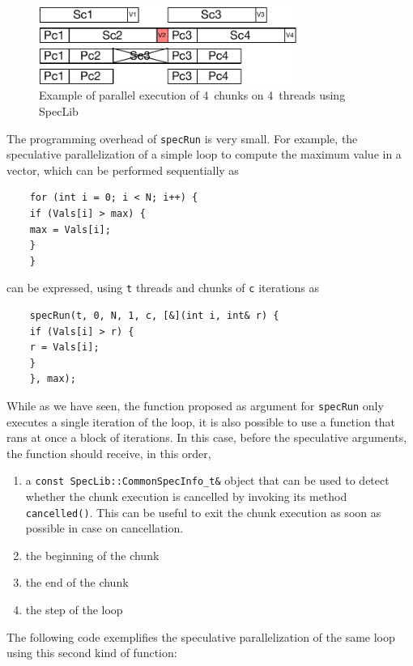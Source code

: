 \documentclass[11pt,a4paper]{article}
\begin{document}
	\begin{figure}[t]
		\begin{center}
			\includegraphics[width=0.75\textwidth]{SpecLib.pdf}
			\caption{Example of parallel execution of 4~chunks on 4~threads using SpecLib}\label{fig:spec_execution}
		\end{center}
	\end{figure}
	
	The programming overhead of {\tt specRun} is very small. For example, the speculative parallelization of a simple loop to compute the maximum value in a vector, which can be performed sequentially as
	
	\begin{verbatim}
	for (int i = 0; i < N; i++) {
	if (Vals[i] > max) {
	max = Vals[i];
	}
	}
	\end{verbatim}
	
	\noindent can be expressed, using {\tt t} threads and chunks of {\tt c} iterations as
	
	\begin{verbatim}
	specRun(t, 0, N, 1, c, [&](int i, int& r) {
	if (Vals[i] > r) {
	r = Vals[i];
	}
	}, max);
	\end{verbatim}
	
	While as we have seen, the function proposed as argument for {\tt specRun} only executes a single iteration of the loop, it is also possible to use a function that rans at once a block of iterations. In this case, before the speculative arguments, the function should receive, in this order,
	\begin{enumerate}
		\item a {\tt const SpecLib::CommonSpecInfo\_t\&} object that can be used to detect whether the chunk execution is cancelled by invoking its method {\tt cancelled()}. This can be useful to exit the chunk execution as soon as possible in case on cancellation.
		\item the beginning of the chunk
		\item the end of the chunk
		\item the step of the loop
	\end{enumerate}
	The following code exemplifies the speculative parallelization of the same loop using this second kind of function:
	
\end{document}
